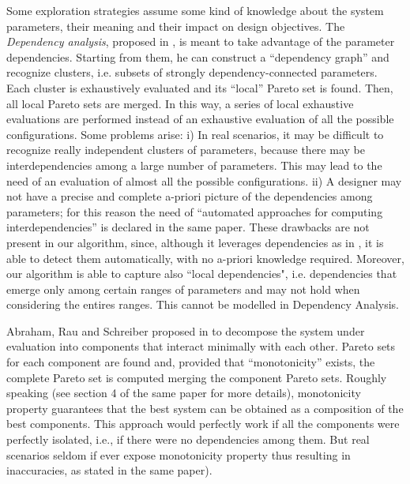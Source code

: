 Some exploration strategies assume some kind of knowledge about the
system parameters, their meaning and their impact on design
objectives.  The \emph{Dependency analysis}, proposed in
\cite{givargis_tvlsi02}, is meant to take advantage of the parameter
dependencies. Starting from them, he can construct a ``dependency graph''
and recognize clusters, i.e. subsets of strongly dependency-connected
parameters. Each cluster is exhaustively evaluated and its ``local''
Pareto set is found. Then, all local Pareto sets are merged. In this
way, a series of local exhaustive evaluations are performed instead of
an exhaustive evaluation of all the possible configurations. Some
problems arise: i) In real scenarios, it may be difficult to recognize
really independent clusters of parameters, because there may be
interdependencies among a large number of parameters. This may lead to
the need of an evaluation of almost all the possible configurations.
ii) A designer may not have a precise and complete a-priori picture of
the dependencies among parameters; for this reason the need of
``automated approaches for computing interdependencies'' is declared
in the same paper.  These drawbacks are not present in our algorithm,
since, although it leverages dependencies as in
\cite{givargis_tvlsi02}, it is able to detect them automatically, with
no a-priori knowledge required. Moreover, our algorithm is able to
capture also ``local dependencies", i.e. dependencies that emerge only
among certain ranges of parameters and may not hold when considering
the entires ranges. This cannot be modelled in Dependency Analysis. 

Abraham, Rau and Schreiber proposed in \cite{santosh_hptr00} to decompose
the system under evaluation into components that interact minimally
with each other. Pareto sets for each component are found and, provided
that ``monotonicity'' exists, the complete Pareto set is computed
merging the component Pareto sets. Roughly speaking (see section 4
of the same paper for more details), monotonicity property guarantees
that the best system can be obtained as a composition of the best
components. This approach would perfectly work if all the components
were perfectly isolated, i.e., if there were no dependencies among
them. But real scenarios seldom if ever
expose monotonicity property thus resulting in inaccuracies, as stated in the same paper).

